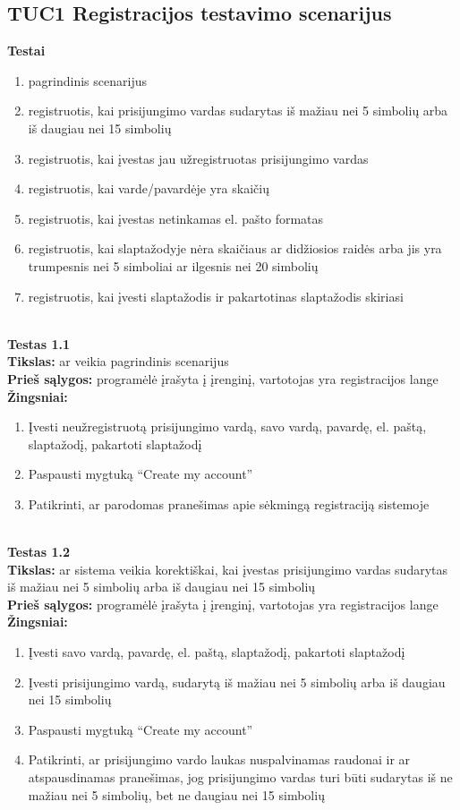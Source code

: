 \documentclass{VUMIFPSkursinis}
\begin{document}
	\subsection{TUC1 Registracijos testavimo scenarijus}
		\textbf{Testai}
		\begin{enumerate}[noitemsep,topsep=0pt]
			\item pagrindinis scenarijus
			\item registruotis, kai prisijungimo vardas sudarytas iš mažiau nei 5 simbolių arba iš daugiau nei 15 simbolių
			\item registruotis, kai įvestas jau užregistruotas prisijungimo vardas
			\item registruotis, kai varde/pavardėje yra skaičių
			\item registruotis, kai įvestas netinkamas el. pašto formatas
			\item registruotis, kai slaptažodyje nėra skaičiaus ar didžiosios raidės arba jis yra trumpesnis nei 5 simboliai ar ilgesnis nei 20 simbolių
			\item registruotis, kai įvesti slaptažodis ir pakartotinas slaptažodis skiriasi
		\end{enumerate}
		\textbf{}\\
		\textbf{Testas 1.1}\\
		\textbf{Tikslas:} ar veikia pagrindinis scenarijus\\
		\textbf{Prieš sąlygos:} programėlė įrašyta į įrenginį, vartotojas yra registracijos lange\\
		\textbf{Žingsniai:}
		\begin{enumerate}[noitemsep,topsep=0pt]
			\item Įvesti neužregistruotą prisijungimo vardą, savo vardą, pavardę, el. paštą, slaptažodį, pakartoti slaptažodį
			\item Paspausti mygtuką “Create my account” 
			\item Patikrinti, ar parodomas pranešimas apie sėkmingą registraciją sistemoje
		\end{enumerate}
		\textbf{}\\
		\textbf{Testas 1.2}\\
		\textbf{Tikslas:} ar sistema veikia korektiškai, kai įvestas prisijungimo vardas sudarytas iš mažiau nei 5 simbolių arba iš daugiau nei 15 simbolių\\
		\textbf{Prieš sąlygos:} programėlė įrašyta į įrenginį, vartotojas yra registracijos lange\\
		\textbf{Žingsniai:}
		\begin{enumerate}[noitemsep,topsep=0pt]
			\item Įvesti savo vardą, pavardę, el. paštą, slaptažodį, pakartoti slaptažodį
			\item Įvesti prisijungimo vardą, sudarytą iš mažiau nei 5 simbolių arba iš daugiau nei 15 simbolių
			\item Paspausti mygtuką “Create my account” 
			\item Patikrinti, ar prisijungimo vardo laukas nuspalvinamas raudonai ir ar atspausdinamas pranešimas, jog prisijungimo vardas turi būti sudarytas iš ne mažiau nei 5 simbolių, bet ne daugiau nei 15 simbolių
		\end{enumerate}
\end{document}
